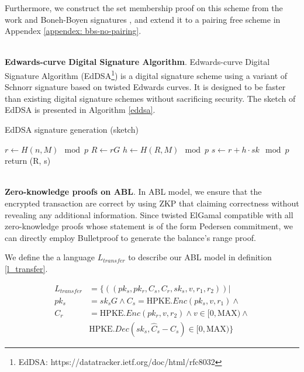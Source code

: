 \documentclass{article}
\begin{document}
Furthermore, we construct the set membership proof on this scheme from the work \cite{camenisch2008efficient} and Boneh-Boyen signatures \cite{jao2009boneh}, and extend it to a pairing free scheme in Appendex \ref{appendex: bbs-no-pairing}.

~\\
\noindent\textbf{Edwards-curve Digital Signature Algorithm}. Edwards-curve Digital Signature Algorithm (EdDSA\footnote{EdDSA: https://datatracker.ietf.org/doc/html/rfc8032}) is a digital signature scheme using a variant of Schnorr signature based on twisted Edwards curves. It is designed to be faster than existing digital signature schemes without sacrificing security. The sketch of EdDSA is presented in Algorithm \ref{eddsa}.

\begin{algorithm}
 \caption{EdDSA signature generation (sketch)}
 \label{eddsa}
 \LinesNumbered
 
 $r \gets H(n, M) \mod{p}$ \;
 $R \gets rG$ \;
 $h \gets H(R, M) \mod{p}$ \;
 $s \gets r + h \cdot sk \mod{p}$ \;
  return (R, s)
\end{algorithm}

~\\
\noindent\textbf{Zero-knowledge proofs on ABL}. In ABL model, we ensure that the encrypted transaction are correct by using ZKP that claiming correctness without revealing any additional information. Since twisted ElGamal compatible with all zero-knowledge proofs whose statement is of the form Pedersen commitment, we can directly employ Bulletproof to generate the balance's range proof. 

We define the a language $L_{transfer}$ to describe our ABL model in definition \ref{l_transfer}.

\begin{equation}\label{l_transfer}
\begin{aligned}
    L_{transfer} &= \{((pk_s, pk_r, C_s, C_r, sk_s, v, r_1, r_2)) | \\ 
        pk_s &= sk_sG \land C_s = \mbox{HPKE}.Enc(pk_s,v, r_1) \land \\
        C_r &=  \mbox{HPKE}.Enc(pk_r,v, r_2) \land v \in [0, \mbox{MAX}) \land \\
        &\mbox{HPKE}.Dec(sk_s, \hat{C}_s - C_s) \in [0, \mbox{MAX})\}
\end{aligned}
\end{equation}
\end{document}
